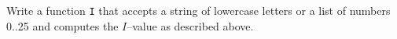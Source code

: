   Write a function \verb!I! that accepts a string of lowercase
  letters or a list of numbers 0..25 and computes the
  $I$--value as described above.
